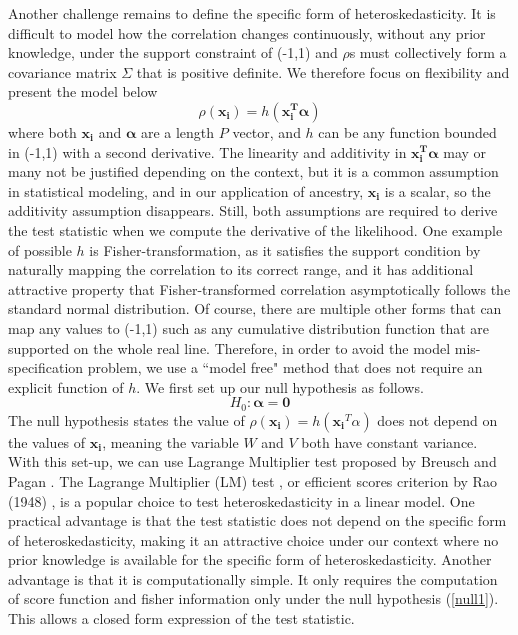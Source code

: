 \documentclass[12pt]{article}
\theoremstyle{theorem}
\begin{document}
\noindent Another challenge remains to define the specific form of heteroskedasticity. It is difficult to model how the correlation changes continuously, without any prior knowledge, under the support constraint of (-1,1) and $\rho$s must collectively form a covariance matrix $\Sigma$ that is positive definite. We therefore focus on flexibility and present the model below
$$\rho(\bm{x_i}) = h(\bm{x_i^T}\bm{\alpha})$$
where both $\bm{x_i}$ and $\bm{\alpha}$ are a length $P$ vector, and $h$ can be any function bounded in (-1,1) with a second derivative. The linearity and additivity in $\bm{x_i^T\alpha}$ may or many not be justified depending on the context, but it is a common assumption in statistical modeling, and in our application of ancestry, $\bm{x_i}$ is a scalar, so the additivity assumption disappears. Still, both assumptions are required to derive the test statistic when we compute the derivative of the likelihood. One example of possible $h$ is Fisher-transformation, as it satisfies the support condition by naturally mapping the correlation to its correct range, and it has additional attractive property that Fisher-transformed correlation asymptotically follows the standard normal distribution. Of course, there are multiple other forms that can map any values to (-1,1) such as any cumulative distribution function that are supported on the whole real line. Therefore, in order to avoid the model mis-specification problem, we use a ``model free" method that does not require an explicit function of $h$. We first set up our null hypothesis as follows.
\begin{equation}
H_0: \bm{\alpha} = \bm{0}
\label{null1}
\end{equation}
The null hypothesis states the value of $\rho(\bm{x_i}) = h(\bm{x_i}^T\alpha)$ does not depend on the values of $\bm{x_i}$, meaning the variable $W$ and $V$ both have constant variance. 
With this set-up, we can use Lagrange Multiplier test proposed by Breusch and Pagan \cite{breusch1979simple}. 
\noindent 
The Lagrange Multiplier (LM) test \cite{breusch1979simple}, or efficient scores criterion by Rao (1948) \cite{rao1948large}, is a popular choice to test heteroskedasticity in a linear model. One practical advantage is that the test statistic does not depend on the specific form of heteroskedasticity, making it an attractive choice under our context where no prior knowledge is available for the specific form of heteroskedasticity. Another advantage is that it is computationally simple. It only requires the computation of score function and fisher information only under the null hypothesis (\ref{null1}). This allows a closed form expression of the test statistic. \\
\end{document}
